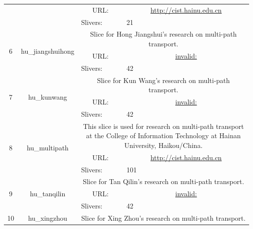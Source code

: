 \begin{small}
\begin{center}
\begin{longtable}{|c|c|c|c|}
  &  & \multicolumn{1}{|p{5em}|}{URL:} & \multicolumn{1}{|p{22.5em}|}{\url{http://cist.hainu.edu.cn}} \\* \cline{3-3}\cline{4-4}
  &  & \multicolumn{1}{|l|}{Slivers:} & \multicolumn{1}{|l|}{21} \\ \hline
 \multirow{3}{*}{6} & \multirow{3}{*}{\index{hu\_jiangshuihong}\index{Slice!hu\_jiangshuihong}hu\_jiangshuihong} & \multicolumn{2}{|p{30em}|}{Slice for Hong Jiangshui's research on multi-path transport.} \\* \cline{3-3}\cline{4-4}
  &  & \multicolumn{1}{|p{5em}|}{URL:} & \multicolumn{1}{|p{22.5em}|}{\url{invalid:}} \\* \cline{3-3}\cline{4-4}
  &  & \multicolumn{1}{|l|}{Slivers:} & \multicolumn{1}{|l|}{42} \\ \hline
 \multirow{3}{*}{7} & \multirow{3}{*}{\index{hu\_kunwang}\index{Slice!hu\_kunwang}hu\_kunwang} & \multicolumn{2}{|p{30em}|}{Slice for Kun Wang's research on multi-path transport.} \\* \cline{3-3}\cline{4-4}
  &  & \multicolumn{1}{|p{5em}|}{URL:} & \multicolumn{1}{|p{22.5em}|}{\url{invalid:}} \\* \cline{3-3}\cline{4-4}
  &  & \multicolumn{1}{|l|}{Slivers:} & \multicolumn{1}{|l|}{42} \\ \hline
 \multirow{3}{*}{8} & \multirow{3}{*}{\index{hu\_multipath}\index{Slice!hu\_multipath}hu\_multipath} & \multicolumn{2}{|p{30em}|}{This slice is used for research on multi-path transport at the College of Information Technology at Hainan University, Haikou/China.} \\* \cline{3-3}\cline{4-4}
  &  & \multicolumn{1}{|p{5em}|}{URL:} & \multicolumn{1}{|p{22.5em}|}{\url{http://cist.hainu.edu.cn}} \\* \cline{3-3}\cline{4-4}
  &  & \multicolumn{1}{|l|}{Slivers:} & \multicolumn{1}{|l|}{101} \\ \hline
 \multirow{3}{*}{9} & \multirow{3}{*}{\index{hu\_tanqilin}\index{Slice!hu\_tanqilin}hu\_tanqilin} & \multicolumn{2}{|p{30em}|}{Slice for Tan Qilin's research on multi-path transport.} \\* \cline{3-3}\cline{4-4}
  &  & \multicolumn{1}{|p{5em}|}{URL:} & \multicolumn{1}{|p{22.5em}|}{\url{invalid:}} \\* \cline{3-3}\cline{4-4}
  &  & \multicolumn{1}{|l|}{Slivers:} & \multicolumn{1}{|l|}{42} \\ \hline
 \multirow{3}{*}{10} & \multirow{3}{*}{\index{hu\_xingzhou}\index{Slice!hu\_xingzhou}hu\_xingzhou} & \multicolumn{2}{|p{30em}|}{Slice for Xing Zhou's research on multi-path transport.} \\* \cline{3-3}\cline{4-4}

\end{longtable}
\end{center}
\end{small}
